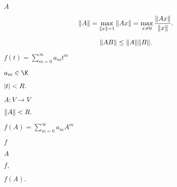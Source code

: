 \documentclass[10pt]{book}
\begin{document}
\begin{mdSnippets}
\begin{mdInlineSnippet}[7fc56270e7a70fa81a5935b72eacbe29]
$A$\end{mdInlineSnippet}%
\begin{mdDisplaySnippet}[d5aff0e4c6f157e3a8e4662e3a7af175]%
\[%
\norm{A} = \max_{\norm{x} = 1} \norm{Ax} = \max_{x \ne 0} \frac{\norm{Ax}}{\norm{x}}.
\]%
\end{mdDisplaySnippet}%
\begin{mdDisplaySnippet}[7c9e0f88615d3c4f2d6bc208c81aaf1a]%
\[%
\norm{AB} \le \norm{A} \norm{B}.
\]%
\end{mdDisplaySnippet}%
\begin{mdInlineSnippet}[564c457289d6b706c933f3efcdcc2b15]%
$f(t) = \sum_{m=0}^\infty a_m t^m$\end{mdInlineSnippet}%
\begin{mdInlineSnippet}%
$a_m \in \K$\end{mdInlineSnippet}%
\begin{mdInlineSnippet}[850da3624f1462d945cb86c5d130168b]%
$\left\vert t\right\vert < R.$\end{mdInlineSnippet}%
\begin{mdInlineSnippet}[3803e0504fbff96c773375f64b1287d1]%
$A: V \to V$\end{mdInlineSnippet}%
\begin{mdInlineSnippet}[b0aa44afe6c5207015f3962860657e1c]%
$\norm{A} < R.$\end{mdInlineSnippet}%
\begin{mdInlineSnippet}%
$f(A) = \sum_{m=0}^\infty a_m A^m$\end{mdInlineSnippet}%
\begin{mdInlineSnippet}%
$f$\end{mdInlineSnippet}%
\begin{mdInlineSnippet}[7fc56270e7a70fa81a5935b72eacbe29]%
$A$\end{mdInlineSnippet}%
\begin{mdInlineSnippet}[0e05bed100c5460dd523f83322b3e4d7]%
$f,$\end{mdInlineSnippet}%
\begin{mdInlineSnippet}[f0f61960351d7b08f6fd3e5212f1b01c]%
$f(A).$\end{mdInlineSnippet}%

\end{mdSnippets}
\end{document}
